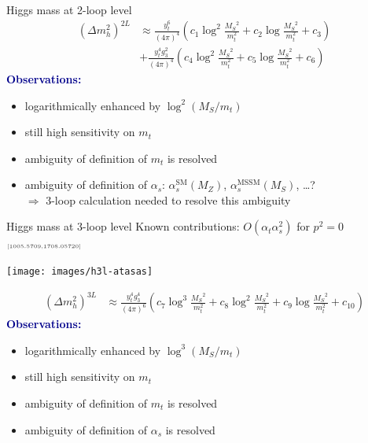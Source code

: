\documentclass[hyperref={pdfpagelabels=false},ngerman]{beamer}
\newcommand{\cmark}{\ding{51}}%
\newcommand{\ok}{\textcolor{darkgreen}{\cmark}}
\newcommand{\MS}{\ensuremath{M_S}}
\newcommand{\mycite}[1]{\ensuremath{\text{\textcolor{darkgray}{\tiny [#1]}}}}
\renewcommand{\emph}[1]{\textbf{\textcolor{darkblue}{#1}}}
\newcommand{\SM}{\ensuremath{\text{SM}}}
\newcommand{\MSSM}{\ensuremath{\text{MSSM}}}
\newcommand{\at}{\alpha_t}
\newcommand{\as}{\alpha_s}
\begin{document}
\begin{frame}{Higgs mass at 2-loop level}
  \begin{align*}
    (\Delta m_h^2)^{2L} &\approx
    \frac{y_t^6}{(4\pi)^4} \left(
      c_1 \log^2\frac{\MS^2}{m_t^2}
      + c_2 \log\frac{\MS^2}{m_t^2}
      + c_3
    \right) \\
    & +
    \frac{y_t^4 g_3^2}{(4\pi)^4} \left(
      c_4 \log^2\frac{\MS^2}{m_t^2}
      + c_5 \log\frac{\MS^2}{m_t^2}
      + c_6
    \right)
  \end{align*}
  \emph{Observations:}
  \begin{itemize}
  \item logarithmically enhanced by $\log^2(\MS/m_t)$
  \item still high sensitivity on $m_t$
  \item ambiguity of definition of $m_t$ is resolved \ok
  \item ambiguity of definition of $\as$: $\as^\SM(M_Z)$, $\as^\MSSM(\MS)$, \ldots ? \\
    $\Rightarrow$ 3-loop calculation needed to resolve this ambiguity
  \end{itemize}
\end{frame}


\begin{frame}{Higgs mass at 3-loop level}
  Known contributions: $O(\at\as^2)$ for $p^2 = 0$ \mycite{1005.5709,1708.05720}
  \begin{center}
    \texttt{[image: images/h3l-atasas]}
  \end{center}
  \begin{align*}
    (\Delta m_h^2)^{3L} &\approx
    \frac{y_t^4 g_3^4}{(4\pi)^6} \left(
      c_7 \log^3\frac{\MS^2}{m_t^2}
      + c_8 \log^2\frac{\MS^2}{m_t^2}
      + c_9 \log\frac{\MS^2}{m_t^2}
      + c_{10}
    \right)
  \end{align*}
  \emph{Observations:}
  \begin{itemize}
  \item logarithmically enhanced by $\log^3(\MS/m_t)$
  \item still high sensitivity on $m_t$
  \item ambiguity of definition of $m_t$ is resolved \ok
  \item ambiguity of definition of $\as$ is resolved \ok
  \end{itemize}
\end{frame}
\end{document}
